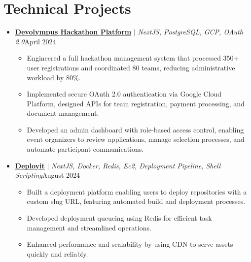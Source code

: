\documentclass[letterpaper,11pt]{article}
\begin{document}
\section{Technical Projects}
\vspace{-1pt}
\begin{itemize}[leftmargin=*,itemsep=2pt,parsep=0pt,topsep=0pt,partopsep=0pt]

	\item \textbf{\href{https://devolympus.deviatorsdce.tech}{Devolympus Hackathon Platform}} $|$ \emph{NextJS, PostgreSQL, GCP, OAuth 2.0}\hfill {April 2024}
	      \begin{itemize}[leftmargin=*,itemsep=1pt,parsep=0pt,topsep=0pt,partopsep=0pt]
		      \item Engineered a full hackathon management system that processed 350+ user registrations and coordinated 80 teams, reducing administrative workload by 80\%.
		      \item Implemented secure OAuth 2.0 authentication via Google Cloud Platform, designed APIs for team registration, payment processing, and document management.
		      \item Developed an admin dashboard with role-based access control, enabling event organizers to review applications, manage selection processes, and automate participant communications.
	      \end{itemize}

	\item \textbf{\href{https://deployit.live/}{Deployit}} $|$ \emph{NextJS, Docker, Redis, Ec2, Deployment Pipeline, Shell Scripting}\hfill {August 2024}
	      \begin{itemize}[leftmargin=*,itemsep=1pt,parsep=0pt,topsep=0pt,partopsep=0pt]
		      \item Built a deployment platform enabling users to deploy repositories with a custom
		            slug URL, featuring automated build and deployment processes.
		      \item Developed deployment queueing using Redis for efficient task management and
		            streamlined operations.
		      \item Enhanced performance and scalability by using CDN to serve assets quickly and
		            reliably.
	      \end{itemize}

\end{itemize}
\vspace{-8pt}
\end{document}
